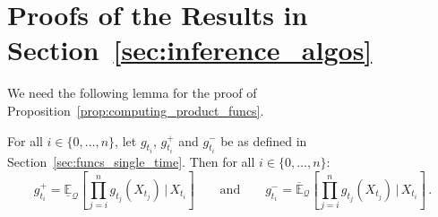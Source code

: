 \documentclass[twoside,11pt]{article}
\newcommand{\rateset}{\mathcal{Q}}
\begin{document}
\section{Proofs of the Results in Section~\ref{sec:inference_algos}}

We need the following lemma for the proof of Proposition~\ref{prop:computing_product_funcs}.
\begin{lemma}\label{lemma:product_func_induction}
For all $i\in\{0,\dots,n\}$, let $g_{t_i}$, $g_{t_i}^+$ and $g_{t_i}^-$ be as defined in Section~\ref{sec:funcs_single_time}. Then for all $i\in\{0,\dots,n\}$:
\begin{equation*}
g_{t_i}^+ = \underline{\mathbb{E}}_{\rateset}\left[\prod_{j=i}^{n}g_{t_j}(X_{t_j})\,\Bigg\vert\,X_{t_i}\right] \quad\quad\text{and} \quad\quad g_{t_i}^- = \overline{\mathbb{E}}_{\rateset}\left[\prod_{j=i}^{n}g_{t_j}(X_{t_j})\,\Bigg\vert\,X_{t_i}\right]\,.
\end{equation*}
\end{lemma}
\end{document}

